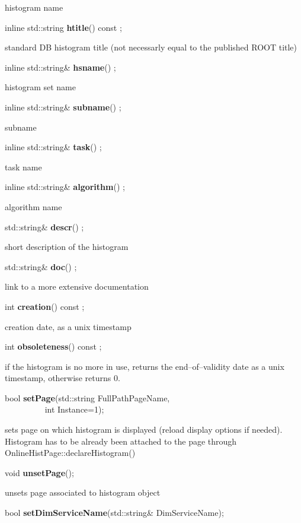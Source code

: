  histogram name


\item    inline std::string {\bf htitle}() const ;

 standard DB histogram title (not necessarly equal to the published ROOT title)


\item    inline std::string\& {\bf hsname}() ;

 histogram set name


\item    inline std::string\& {\bf subname}() ;

 subname


\item    inline std::string\& {\bf task}() ;

 task name


\item    inline std::string\& {\bf algorithm}() ;

 algorithm name


\item    std::string\& {\bf descr}() ;

 short description of the histogram


\item    std::string\& {\bf doc}() ;

 link to a more extensive documentation


\item    int {\bf creation}() const ;

 creation date, as a unix timestamp


\item    int {\bf obsoleteness}() const ;

 if the histogram is no more in use, returns the end--of--validity date
 as a unix timestamp, otherwise returns 0.


\item    bool {\bf setPage}(std::string FullPathPageName,\\\mbox{}~~~~~~~~~
	       int Instance=1);

 sets page on which histogram is displayed (reload display options if needed). Histogram has to be already
 been attached to the page through OnlineHistPage::declareHistogram()


\item    void {\bf unsetPage}();


 unsets page associated to histogram object


\item    bool {\bf setDimServiceName}(std::string\& DimServiceName);


